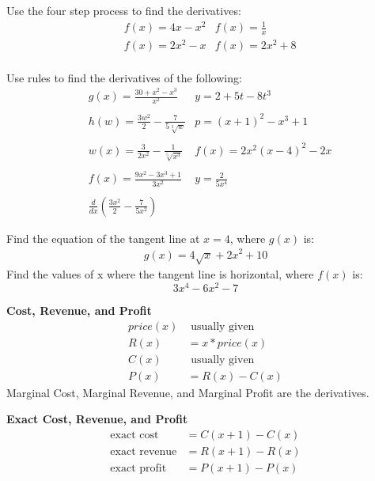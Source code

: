 \documentclass[12pt]{extarticle}
\begin{document}
Use the four step process to find the derivatives:
\begin{align*}
	&f(x) = 4x - x^2
	&f(x) = \frac{1}{x}\\
	&f(x)= 2x^2 -x &f(x)=2x^2+8
\end{align*}
\\
Use rules to find the derivatives of the following:
\begin{align*}
	&g(x)= \frac{30 + x^2 - x^3}{x^2}
	&y = 2 + 5t - 8t^3
	\\\\
	&h(w) = \frac{3w^2}{2} - \frac{7}{5\sqrt[3]{w}}
	&p=(x+1)^2 - x^3 +1
	\\\\
	&w(x) = \frac{3}{2x^2} - \frac{1}{\sqrt[5]{x^3}}
	&f(x) = 2x^2(x-4)^2 -2x
	\\\\
	&f(x) = \frac{9x^2 - 3x^3 +1}{3x^2} &y=\frac{2}{5x^4} \\\\
	&\frac{d}{dx}\left(\frac{3x^2}{2} - \frac{7}{5x^2}\right)
\end{align*}

Find the equation of the tangent line at $x=4$, where $g(x)$ is:
\begin{align*}
	g(x) = 4\sqrt{x} + 2x^2 +10
\end{align*}
Find the values of x where the tangent line is horizontal, where $f(x)$ is:
$$3x^4-6x^2-7$$

\cleardoublepage

\begin{tcolorbox}[enhanced jigsaw,colback=bg,boxrule=0pt,arc=0pt]
	\textbf{Cost, Revenue, and Profit}
	\begin{align*}
		price(x)& \text{ usually given} \tag{price} \\
		R(x)&= x* price(x) \tag{revenue} \\
		C(x)& \text{ usually given} \tag{cost} \\
		P(x)&= R(x) - C(x)\tag{profit}
	\end{align*}
Marginal Cost, Marginal Revenue, and Marginal Profit are the derivatives.
\end{tcolorbox}
\begin{tcolorbox}[enhanced jigsaw,colback=bg,boxrule=0pt,arc=0pt]
	\textbf{Exact Cost, Revenue, and Profit}
	\begin{align*}
		\text{exact cost} &= C(x+1)-C(x) \\
		\text{exact revenue} &= R(x+1) - R(x) \\
		\text{exact profit} &= P(x+1) - P(x)
	\end{align*}
\end{tcolorbox}
\end{document}
